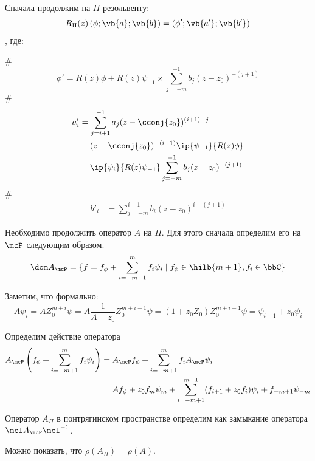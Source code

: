 Сначала продолжим на $\Pi$ резольвенту:
\begin{align*}
R_\Pi(z) \left( \phi; \vb{a}; \vb{b} \right) = \left( \phi'; \vb{a'}; \vb{b'} \right)
\end{align*}
, где:
\begin{ilist}
#
\[
\phi' = R(z) \phi + R(z) \psi_{-1} \times \sum\limits_{j = -m}^{-1} b_j (z - z_0)^{-(j + 1)}
\]
#
\begin{align*}
a'_i
&= \sum\limits_{j = i + 1}^{-1} a_j (z - \cconj{z_0})^{(i + 1) - j} \\
&+ (z - \cconj{z_0})^{-(i + 1)} \ip{\psi_{-1}}{R(z) \phi} \\
&+ \ip{\psi_i}{R(z) \psi_{-1}} \sum\limits_{j = -m}^{-1} b_j (z - z_0)^{-(j + 1)}
\end{align*}
#
\begin{align*}
b'_i
&= \sum\limits_{j = -m}^{i - 1} b_i (z - z_0)^{i - (j + 1)}
\end{align*}
\end{ilist}



Необходимо продолжить оператор $A$ на $\Pi$. Для этого сначала определим его на $\mcP$ следующим образом.
\[
\dom A_\mcP = \{f = f_\phi + \sum\limits_{i = -m + 1}^{m} f_i \psi_i \mid f_\phi \in \hilb{m + 1}, f_{i}\in \bbC \}
\]

Заметим, что формально:
\[
A \psi_i = A Z_0^{m + i} \psi = A \frac{1}{A - z_0} Z_0^{m + i - 1} \psi = (1 + z_0 Z_0) Z_0^{m + i - 1} \psi = \psi_{i - 1} + z_0 \psi_i
\]

Определим действие оператора 
\begin{align*}
A_\mcP \left( f_\phi + \sum\limits_{i = -m + 1}^{m} f_i \psi_i \right)
& = A_\mcP f_\phi + \sum\limits_{i = -m + 1}^{m} f_i A_\mcP \psi_i \\
& = A f_\phi + z_0 f_m \psi_m + \sum\limits_{i = -m + 1}^{m - 1} (f_{i + 1} + z_0 f_i) \psi_i + f_{-m + 1} \psi_{-m}
\end{align*}

Оператор $A_\Pi$ в понтрягинском пространстве определим как замыкание оператора $\mcI A_\mcP \mcI^{-1}$. 

Можно показать, что $\rho(A_\Pi) = \rho(A)$.



